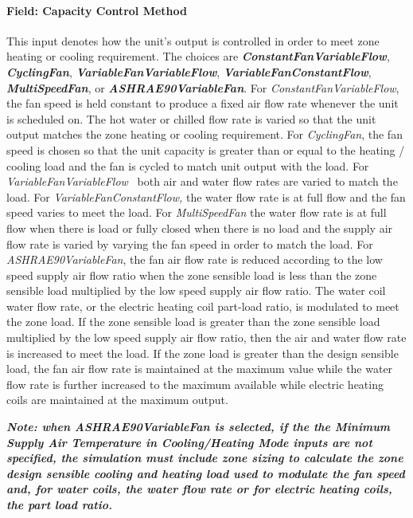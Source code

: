 \paragraph{Field: Capacity Control Method}\label{field-capacity-control-method}

This input denotes how the unit's output is controlled in order to meet zone heating or cooling requirement. The choices are \textbf{\emph{ConstantFanVariableFlow}}, \textbf{\emph{CyclingFan}}, \textbf{\emph{VariableFanVariableFlow}}, \textbf{\emph{VariableFanConstantFlow}}, \textbf{\emph{MultiSpeedFan}}, or \textbf{\emph{ASHRAE90VariableFan}}. For \emph{ConstantFanVariableFlow}, the fan speed is held constant to produce a fixed air flow rate whenever the unit is scheduled on. The hot water or chilled flow rate is varied so that the unit output matches the zone heating or cooling requirement. For \emph{CyclingFan}, the fan speed is chosen so that the unit capacity is greater than or equal to the heating / cooling load and the fan is cycled to match unit output with the load. For \emph{VariableFanVariableFlow} ~both air and water flow rates are varied to match the load. For \emph{VariableFanConstantFlow,} the water flow rate is at full flow and the fan speed varies to meet the load. For \emph{MultiSpeedFan} the water flow rate is at full flow when there is load or fully closed when there is no load and the supply air flow rate is varied by varying the fan speed in order to match the load. For \emph{ASHRAE90VariableFan}, the fan air flow rate is reduced according to the low speed supply air flow ratio when the zone sensible load is less than the zone sensible load multiplied by the low speed supply air flow ratio. The water coil water flow rate, or the electric heating coil part-load ratio, is modulated to meet the zone load. If the zone sensible load is greater than the zone sensible load multiplied by the low speed supply air flow ratio, then the air and water flow rate is increased to meet the load. If the zone load is greater than the design sensible load, the fan air flow rate is maintained at the maximum value while the water flow rate is further increased to the maximum available while electric heating coils are maintained at the maximum output.

\textbf{\emph{Note: when ASHRAE90VariableFan is selected, if the the Minimum Supply Air Temperature in Cooling/Heating Mode inputs are not specified, the simulation must include zone sizing to calculate the zone design sensible cooling and heating load used to modulate the fan speed and, for water coils, the water flow rate or for electric heating coils, the part load ratio.}}

